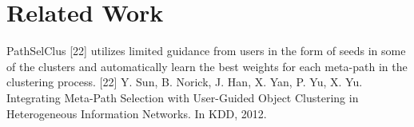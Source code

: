 \section{Related Work}

\cite{Zhu2016} \cite{sun2011pathsim} \cite{Sun:2012:HRP:2124295.2124373} \cite{huang2016meta}
\cite{wang2016relsim} \cite{sun2013pathselclus} \cite{sun2011ASONAM} \cite{Yang2012} \cite{liben2007link}


PathSelClus [22] utilizes limited guidance from users in the form of seeds in some of the clusters and automatically learn the best weights for each meta-path in the clustering process.
[22] Y. Sun, B. Norick, J. Han, X. Yan, P. Yu, X. Yu. Integrating Meta-Path Selection with User-Guided Object Clustering in
Heterogeneous Information Networks. In KDD, 2012.





